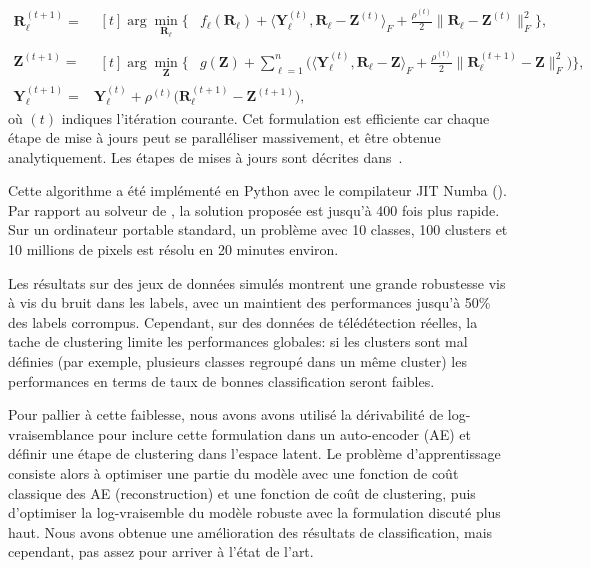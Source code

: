 \begin{align}
  \mathbf{R}_{\ell}^{(t+1)} = {} &  \begin{aligned}[t]
    \arg\min_{\mathbf{R}_\ell}\Bigg\{ & f_{\ell}(\mathbf{R}_\ell) + \langle\mathbf{Y}_\ell^{(t)}, \mathbf{R}_\ell - \mathbf{Z}^{(t)}\rangle_F  + \frac{\rho^{(t)}}{2}\|\mathbf{R}_\ell - \mathbf{Z}^{(t)}\|^2_F\Bigg\},
  \end{aligned}\label{eq:consensus:Rl}\\
  \mathbf{Z}^{(t+1)}  = { }&   \begin{aligned}[t]
    \arg\min_{\mathbf{Z}}\Bigg\{ & g(\mathbf{Z}) + \sum_{\ell=1}^{n} \bigg(\langle\mathbf{Y}_\ell^{(t)}, \mathbf{R}_\ell - \mathbf{Z}\rangle_F   + \frac{\rho^{(t)}}{2}\|\mathbf{R}_\ell^{(t+1)} - \mathbf{Z}\|^2_F\bigg)\Bigg\},
  \end{aligned}\label{eq:consensus:Z}\\
  \mathbf{Y}^{(t+1)}_\ell = {} &\mathbf{Y}^{(t)}_\ell + \rho^{(t)}\big(\mathbf{R}_\ell^{(t+1)}-\mathbf{Z}^{(t+1)}\big), \label{eq:consensus:Y}
\end{align}
où \((t)\) indiques l'itération courante. Cet formulation est efficiente car chaque étape de mise à jours peut se paralléliser massivement, et être obtenue analytiquement. Les étapes de mises à jours sont décrites dans~\cite{GIRYFOUQUET2021320}.

Cette algorithme a été implémenté en Python avec le compilateur JIT Numba (). Par rapport au solveur de \cite{bouveyron-2009-robus-super}, la solution proposée est jusqu'à 400 fois plus rapide. Sur un ordinateur portable standard, un problème avec 10 classes, 100 clusters et 10 millions de pixels est résolu en 20 minutes environ.

Les résultats sur des jeux de données simulés montrent une grande robustesse vis à vis du bruit dans les labels, avec un maintient des performances jusqu'à 50\% des labels corrompus. Cependant, sur des données de télédétection réelles, la tache de clustering limite les performances globales: si les clusters sont mal définies (par exemple, plusieurs classes regroupé dans un même cluster) les performances en terms de taux de bonnes classification seront faibles.

Pour pallier à cette faiblesse, nous avons avons utilisé la dérivabilité de log-vraisemblance pour inclure cette formulation dans un auto-encoder (AE) et définir une étape de clustering dans l'espace latent. Le problème d'apprentissage consiste alors à optimiser une partie du modèle avec une fonction de coût classique des AE (reconstruction) et une fonction de coût de clustering, puis d'optimiser la log-vraisemble du modèle robuste avec la formulation discuté plus haut. Nous avons obtenue une amélioration des résultats de classification, mais cependant, pas assez pour arriver à l'état de l'art.

